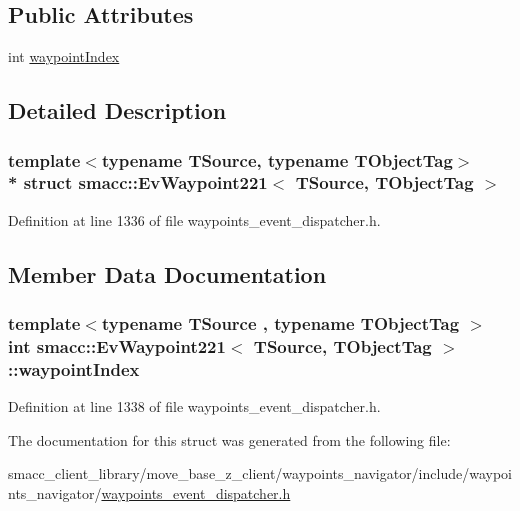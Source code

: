 \subsection*{Public Attributes}
\begin{DoxyCompactItemize}
\item 
int \hyperlink{structsmacc_1_1EvWaypoint221_a1b176ac5da35600757daa188ece865e5}{waypoint\+Index}
\end{DoxyCompactItemize}


\subsection{Detailed Description}
\subsubsection*{template$<$typename T\+Source, typename T\+Object\+Tag$>$\\*
struct smacc\+::\+Ev\+Waypoint221$<$ T\+Source, T\+Object\+Tag $>$}



Definition at line 1336 of file waypoints\+\_\+event\+\_\+dispatcher.\+h.



\subsection{Member Data Documentation}
\subsubsection[{\texorpdfstring{waypoint\+Index}{waypointIndex}}]{\setlength{\rightskip}{0pt plus 5cm}template$<$typename T\+Source , typename T\+Object\+Tag $>$ int {\bf smacc\+::\+Ev\+Waypoint221}$<$ T\+Source, T\+Object\+Tag $>$\+::waypoint\+Index}\hypertarget{structsmacc_1_1EvWaypoint221_a1b176ac5da35600757daa188ece865e5}{}\label{structsmacc_1_1EvWaypoint221_a1b176ac5da35600757daa188ece865e5}


Definition at line 1338 of file waypoints\+\_\+event\+\_\+dispatcher.\+h.



The documentation for this struct was generated from the following file\+:\begin{DoxyCompactItemize}
\item 
smacc\+\_\+client\+\_\+library/move\+\_\+base\+\_\+z\+\_\+client/waypoints\+\_\+navigator/include/waypoints\+\_\+navigator/\hyperlink{waypoints__event__dispatcher_8h}{waypoints\+\_\+event\+\_\+dispatcher.\+h}\end{DoxyCompactItemize}
